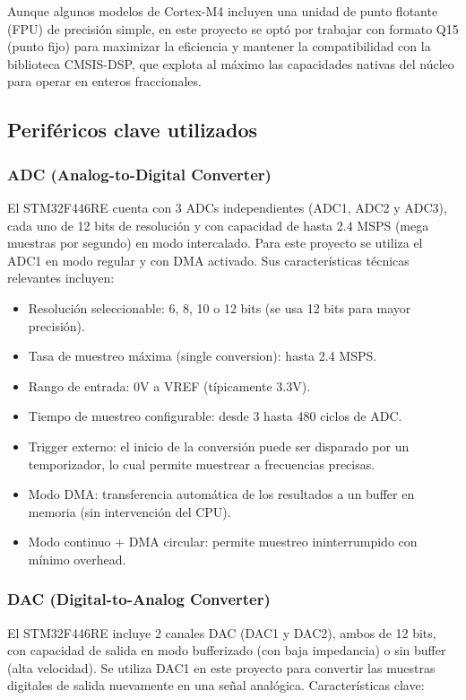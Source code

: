 \documentclass[12pt]{article}
\begin{document}
	Aunque algunos modelos de Cortex-M4 incluyen una unidad de punto flotante (FPU) de precisión simple, en este proyecto se optó por trabajar con formato Q15 (punto fijo) para maximizar la eficiencia y mantener la compatibilidad con la biblioteca CMSIS-DSP, que explota al máximo las capacidades nativas del núcleo para operar en enteros fraccionales.
	
	\subsection{Periféricos clave utilizados}
	\subsubsection{ADC (Analog-to-Digital Converter)}
	El STM32F446RE cuenta con 3 ADCs independientes (ADC1, ADC2 y ADC3), cada uno de 12 bits de resolución y con capacidad de hasta 2.4 MSPS (mega muestras por segundo) en modo intercalado. Para este proyecto se utiliza el ADC1 en modo regular y con DMA activado. Sus características técnicas relevantes incluyen:
	
	\begin{itemize}
		\item Resolución seleccionable: 6, 8, 10 o 12 bits (se usa 12 bits para mayor precisión).
		
		\item Tasa de muestreo máxima (single conversion): hasta 2.4 MSPS.
		
		\item Rango de entrada: 0V a VREF (típicamente 3.3V).
		
		\item Tiempo de muestreo configurable: desde 3 hasta 480 ciclos de ADC.
		
		\item Trigger externo: el inicio de la conversión puede ser disparado por un temporizador, lo cual permite muestrear a frecuencias precisas.
		
		\item Modo DMA: transferencia automática de los resultados a un buffer en memoria (sin intervención del CPU).
		
		\item Modo continuo + DMA circular: permite muestreo ininterrumpido con mínimo overhead.
	\end{itemize}
	
	\subsubsection{DAC (Digital-to-Analog Converter)}
	El STM32F446RE incluye 2 canales DAC (DAC1 y DAC2), ambos de 12 bits, con capacidad de salida en modo bufferizado (con baja impedancia) o sin buffer (alta velocidad). Se utiliza DAC1 en este proyecto para convertir las muestras digitales de salida nuevamente en una señal analógica. Características clave:
	
\end{document}
